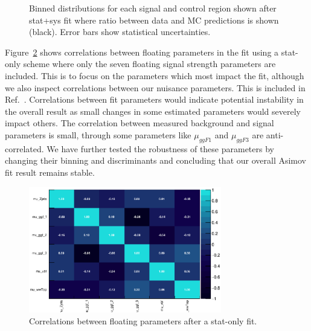 \begin{figure}[!h]
{  }\hfill
  \hfill
{\caption{Binned distributions for each signal and control region shown after stat+sys fit where ratio between data and MC predictions is shown (black). Error bars show statistical uncertainties.}
\label{fig:fitresultsregions}}
\end{figure}

Figure~\ref{fig:correlations} shows correlations between floating parameters in the fit using a stat-only scheme where only the seven floating signal strength parameters are included. This is to focus on the parameters which most impact the fit, although we also inspect correlations between our nuisance parameters. This is included in Ref.~\cite{ourSupportNote}. Correlations between fit parameters would indicate potential instability in the overall result as small changes in some estimated parameters would severely impact others. The correlation between measured background and signal parameters is small, through some parameters like $\mu_{ggF1}$ and $\mu_{ggF3}$ are anti-correlated. We have further tested the robustness of these parameters by changing their binning and discriminants and concluding that our overall Asimov fit result remains stable.  

\begin{figure}[!h]
\centering
\includegraphics[width=0.75\textwidth]{Pictures/fitresults/correlation_stat.eps}
\caption{Correlations between floating parameters after a stat-only fit.}
\label{fig:correlations}
\end{figure}

